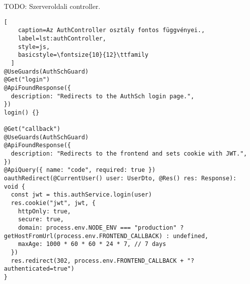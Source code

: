 TODO: Szerveroldali controller.

\begin{minipage}{0.92\textwidth}
  \begin{lstlisting}[
    caption=Az AuthController osztály fontos függvényei.,
    label=lst:authController,
    style=js,
    basicstyle=\fontsize{10}{12}\ttfamily
  ]
@UseGuards(AuthSchGuard)
@Get("login")
@ApiFoundResponse({
  description: "Redirects to the AuthSch login page.",
})
login() {}

@Get("callback")
@UseGuards(AuthSchGuard)
@ApiFoundResponse({
  description: "Redirects to the frontend and sets cookie with JWT.",
})
@ApiQuery({ name: "code", required: true })
oauthRedirect(@CurrentUser() user: UserDto, @Res() res: Response): void {
  const jwt = this.authService.login(user)
  res.cookie("jwt", jwt, {
    httpOnly: true,
    secure: true,
    domain: process.env.NODE_ENV === "production" ? getHostFromUrl(process.env.FRONTEND_CALLBACK) : undefined,
    maxAge: 1000 * 60 * 60 * 24 * 7, // 7 days
  })
  res.redirect(302, process.env.FRONTEND_CALLBACK + "?authenticated=true")
}
\end{lstlisting}
\end{minipage}
